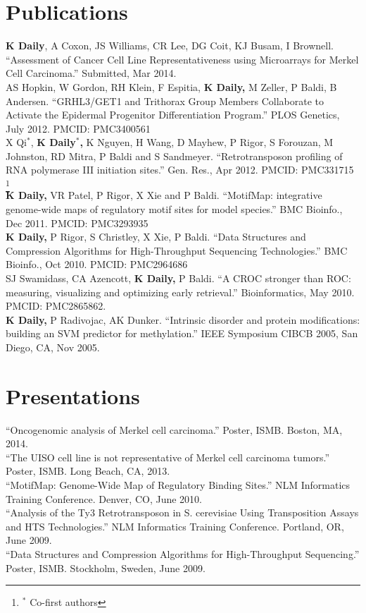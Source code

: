 \documentclass[margin,line]{res}
\begin{document}
\begin{resume}
\section{Publications}
\textbf{K Daily}, A Coxon, JS Williams, CR Lee, DG Coit, KJ Busam, I Brownell. ``Assessment of Cancer Cell Line Representativeness using Microarrays for Merkel Cell Carcinoma.'' Submitted, Mar 2014. \\
AS Hopkin, W Gordon, RH Klein, F Espitia, \textbf{K Daily,} M Zeller, P Baldi, B Andersen. ``GRHL3/GET1 and Trithorax Group Members Collaborate to Activate the Epidermal Progenitor Differentiation Program.'' PLOS Genetics, July 2012. PMCID: PMC3400561\\
X Qi$^*$, \textbf{K Daily$^*$,} K Nguyen, H Wang, D Mayhew, P Rigor, S Forouzan, M Johnston, RD Mitra, P Baldi and S Sandmeyer. ``Retrotransposon profiling of RNA polymerase III initiation sites.'' Gen. Res., Apr 2012. PMCID: PMC331715 \let\thefootnote\relax\footnote{$^*$ Co-first authors} \\
\textbf{K Daily,} VR Patel, P Rigor, X Xie and P Baldi. ``MotifMap: integrative genome-wide maps of regulatory motif sites for model species.'' BMC Bioinfo., Dec 2011. PMCID: PMC3293935\\
\textbf{K Daily,} P Rigor, S Christley, X Xie, P Baldi. ``Data Structures and Compression Algorithms for High-Throughput Sequencing Technologies.'' BMC Bioinfo., Oct 2010. PMCID: PMC2964686\\
SJ Swamidass, CA Azencott, \textbf{K Daily,} P Baldi. ``A CROC stronger than ROC: measuring, visualizing and optimizing early retrieval.'' Bioinformatics, May 2010. PMCID: PMC2865862.\\
\textbf{K Daily,} P Radivojac, AK Dunker. ``Intrinsic disorder and protein modifications: building an SVM predictor for methylation.'' IEEE Symposium CIBCB 2005, San Diego, CA, Nov 2005.

\section{Presentations}
``Oncogenomic analysis of Merkel cell carcinoma.'' Poster, ISMB. Boston, MA, 2014.\\
``The UISO cell line is not representative of Merkel cell carcinoma tumors.'' Poster, ISMB. Long Beach, CA, 2013.\\
``MotifMap: Genome-Wide Map of Regulatory Binding Sites.'' NLM Informatics Training Conference. Denver, CO, June 2010.\\
``Analysis of the Ty3 Retrotransposon in S. cerevisiae Using Transposition Assays and HTS Technologies.'' NLM Informatics Training Conference. Portland, OR, June 2009.\\
``Data Structures and Compression Algorithms for High-Throughput Sequencing.'' Poster, ISMB. Stockholm, Sweden, June 2009.


\end{resume}
\end{document}
